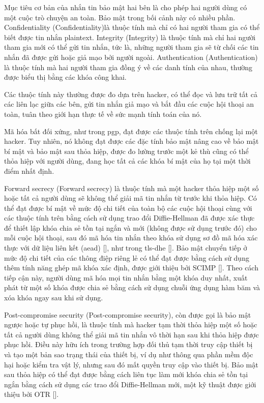 \documentclass[../main-report.tex]{subfiles}
\begin{document}
Mục tiêu cơ bản của nhắn tin bảo mật hai bên là cho phép hai người dùng có một cuộc trò chuyện an toàn. Bảo mật trong bối cảnh này có nhiều phần. \gls{Confidentiality} (\glsdesc{Confidentiality})là thuộc tính mà chỉ có hai người tham gia có thể biết được tin nhắn plaintext. \gls{Integrity} (\glsdesc{Integrity}) là thuộc tính mà chỉ hai người tham gia mới có thể gửi tin nhắn, tức là, những người tham gia sẽ từ chối các tin nhắn đã được gửi hoặc giả mạo bởi người ngoài. \gls{Authentication} (\glsdesc{Authentication}) là thuộc tính mà hai người tham gia đồng ý về các danh tính của nhau, thường được biểu thị bằng các khóa công khai.

Các thuộc tính này thường được đo dựa trên hacker, có thể đọc và lưu trữ tất cả các liên lạc giữa các bên, gửi tin nhắn giả mạo và bắt đầu các cuộc hội thoại an toàn, tuân theo giới hạn thực tế về sức mạnh tính toán của nó.

Mã hóa bất đối xứng, như trong \acrshort{pgp}, đạt được các thuộc tính trên chống lại một hacker. Tuy nhiên, nó không đạt được các đặc tính bảo mật nâng cao về bảo mật bí mật và bảo mật sau thỏa hiệp, được đo lường trước một kẻ thù cũng có thể thỏa hiệp với người dùng, đang học tất cả các khóa bí mật của họ tại một thời điểm nhất định.

\gls{Forward secrecy} (\glsdesc{Forward secrecy}) là thuộc tính mà một hacker thỏa hiệp một số hoặc tất cả người dùng sẽ không thể giải mã tin nhắn từ trước khi thỏa hiệp. Có thể đạt được bí mật về mức độ chi tiết của toàn bộ các cuộc hội thoại cùng với các thuộc tính trên bằng cách sử dụng trao đổi Diffie-Hellman đã được xác thực để thiết lập khóa chia sẻ tồn tại ngắn và mới (không được sử dụng trước đó) cho mỗi cuộc hội thoại, sau đó mã hóa tin nhắn theo khóa sử dụng sơ đồ mã hóa xác thực với dữ liệu liên kết (\acrshort{aead}) [\cite{10}], như trong \acrshort{tls-dhe} [\cite{11}]. Bảo mật chuyển tiếp ở mức độ chi tiết của các thông điệp riêng lẻ có thể đạt được bằng cách sử dụng thêm tính năng ghép mã khóa xác định, được giới thiệu bởi SCIMP [\cite{12}]. Theo cách tiếp cận này, người dùng mã hóa mọi tin nhắn bằng một khóa duy nhất, xuất phát từ một số khóa được chia sẻ bằng cách sử dụng chuỗi ứng dụng hàm băm và xóa khóa ngay sau khi sử dụng.

\gls{Post-compromise security} (\glsdesc{Post-compromise security}), còn được gọi là bảo mật ngược hoặc tự phục hồi, là thuộc tính mà hacker tạm thời thỏa hiệp một số hoặc tất cả người dùng không thể giải mã tin nhắn vô thời hạn sau khi thỏa hiệp được phục hồi. Điều này hữu ích trong trường hợp đối thủ tạm thời truy cập thiết bị và tạo một bản sao trạng thái của thiết bị, ví dụ như thông qua phần mềm độc hại hoặc kiểm tra vật lý, nhưng sau đó mất quyền truy cập vào thiết bị. Bảo mật sau thỏa hiệp có thể đạt được bằng cách liên tục làm mới khóa chia sẻ tồn tại ngắn bằng cách sử dụng các trao đổi Diffie-Hellman mới, một kỹ thuật được giới thiệu bởi OTR [\cite{13}].
\end{document}
